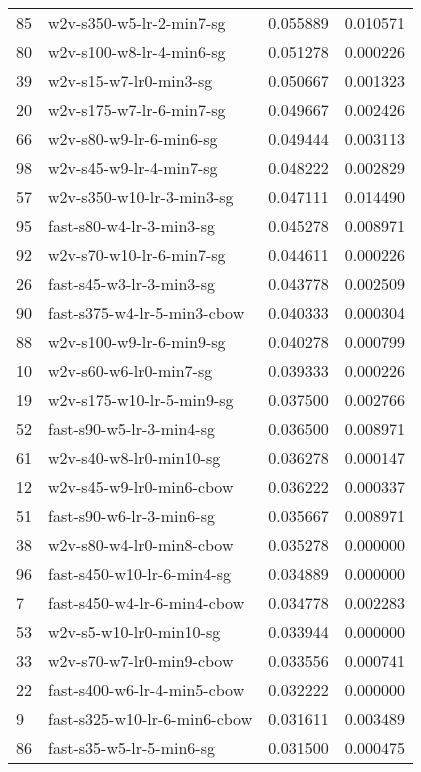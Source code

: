 {\begin{tabular}{llrr}
85 &      w2v-s350-w5-lr-2-min7-sg &  0.055889 &  0.010571 \\
80 &      w2v-s100-w8-lr-4-min6-sg &  0.051278 &  0.000226 \\
39 &        w2v-s15-w7-lr0-min3-sg &  0.050667 &  0.001323 \\
20 &      w2v-s175-w7-lr-6-min7-sg &  0.049667 &  0.002426 \\
66 &       w2v-s80-w9-lr-6-min6-sg &  0.049444 &  0.003113 \\
98 &       w2v-s45-w9-lr-4-min7-sg &  0.048222 &  0.002829 \\
57 &     w2v-s350-w10-lr-3-min3-sg &  0.047111 &  0.014490 \\
95 &      fast-s80-w4-lr-3-min3-sg &  0.045278 &  0.008971 \\
92 &      w2v-s70-w10-lr-6-min7-sg &  0.044611 &  0.000226 \\
26 &      fast-s45-w3-lr-3-min3-sg &  0.043778 &  0.002509 \\
90 &   fast-s375-w4-lr-5-min3-cbow &  0.040333 &  0.000304 \\
88 &      w2v-s100-w9-lr-6-min9-sg &  0.040278 &  0.000799 \\
10 &        w2v-s60-w6-lr0-min7-sg &  0.039333 &  0.000226 \\
19 &     w2v-s175-w10-lr-5-min9-sg &  0.037500 &  0.002766 \\
52 &      fast-s90-w5-lr-3-min4-sg &  0.036500 &  0.008971 \\
61 &       w2v-s40-w8-lr0-min10-sg &  0.036278 &  0.000147 \\
12 &      w2v-s45-w9-lr0-min6-cbow &  0.036222 &  0.000337 \\
51 &      fast-s90-w6-lr-3-min6-sg &  0.035667 &  0.008971 \\
38 &      w2v-s80-w4-lr0-min8-cbow &  0.035278 &  0.000000 \\
96 &    fast-s450-w10-lr-6-min4-sg &  0.034889 &  0.000000 \\
7  &   fast-s450-w4-lr-6-min4-cbow &  0.034778 &  0.002283 \\
53 &       w2v-s5-w10-lr0-min10-sg &  0.033944 &  0.000000 \\
33 &      w2v-s70-w7-lr0-min9-cbow &  0.033556 &  0.000741 \\
22 &   fast-s400-w6-lr-4-min5-cbow &  0.032222 &  0.000000 \\
9  &  fast-s325-w10-lr-6-min6-cbow &  0.031611 &  0.003489 \\
86 &      fast-s35-w5-lr-5-min6-sg &  0.031500 &  0.000475 \\

\end{tabular}}

